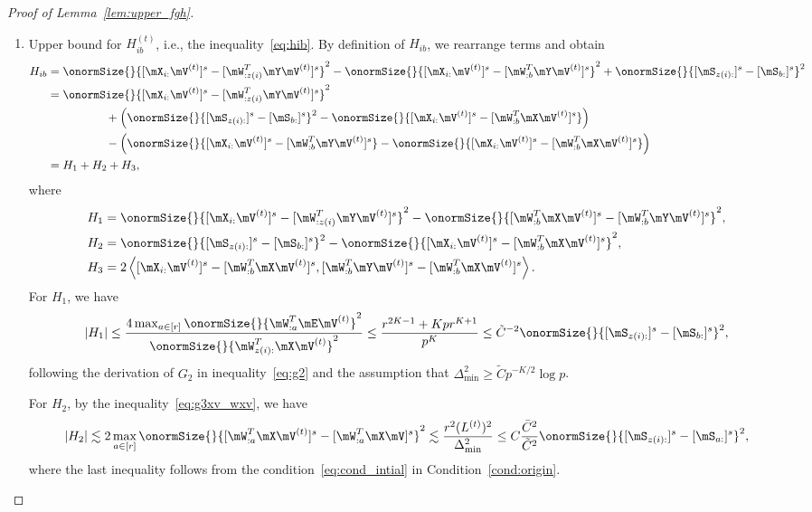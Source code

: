 \documentclass[lettersize,onecolumn,journal]{IEEEtran}
\theoremstyle{definition}
\theoremstyle{definition}
\newcommand{\of}[1]{\left(#1\right)}
\newcommand{\ang}[1]{\left\langle#1\right\rangle}
\begin{document}
\begin{proof}[Proof of Lemma~\ref{lem:upper_fgh}]
\begin{enumerate}[wide]
    \item Upper bound for $H_{ib}^{(t)}$, i.e., the inequality~\eqref{eq:hib}. By definition of $H_{ib}$, we rearrange terms and obtain
    \begin{align}
        H_{ib} &= \onormSize{}{ [\mX_{i:} \mV^{(t)}]^s -  [  \mW_{:z(i)}^T \mY \mV^{(t)} ]^s}^2 - \onormSize{}{ [\mX_{i:} \mV^{(t)}]^s -  [  \mW_{:b}^T \mY \mV^{(t)} ]^s}^2 + \onormSize{}{ [ \mS_{z(i):}  ]^s - [ \mS_{b:}  ]^s  }^2 \\
        & =  \onormSize{}{ [ \mX_{i:} \mV^{(t)}]^s -  [  \mW_{:z(i)}^T \mY \mV^{(t)} ]^s}^2 \\
        & \quad \quad \quad \quad \quad + \of{ \onormSize{}{ [ \mS_{z(i):}  ]^s - [ \mS_{b:}  ]^s  }^2 - \onormSize{}{ [\mX_{i:} \mV^{(t)}]^s-  [  \mW_{:b}^T \mX \mV^{(t)} ]^s }  } \\
        & \quad \quad \quad \quad \quad  - \of{\onormSize{}{ [\mX_{i:} \mV^{(t)}]^s-  [  \mW_{:b}^T \mY \mV^{(t)} ]^s } -  \onormSize{}{ [\mX_{i:} \mV^{(t)}]^s-  [  \mW_{:b}^T \mX \mV^{(t)} ]^s }   } \\
        & = H_1 + H_2 + H_3,
    \end{align}
    where 
    \begin{align}
        H_1 &= \onormSize{}{ [ \mX_{i:} \mV^{(t)}]^s -  [  \mW_{:z(i)}^T \mY \mV^{(t)} ]^s}^2 - \onormSize{}{ [ \mW_{:b}^T \mX \mV^{(t)}]^s -  [ \mW_{:b}^T \mY \mV^{(t)}]^s}^2, \\
        H_2 &=  \onormSize{}{ [ \mS_{z(i):}  ]^s - [ \mS_{b:}  ]^s  }^2 - \onormSize{}{ [\mX_{i:} \mV^{(t)}]^s-  [  \mW_{:b}^T \mX \mV^{(t)} ]^s }^2  , \\
        H_3 & = 2 \ang{  [\mX_{i:} \mV^{(t)}]^s  -  [  \mW_{:b}^T \mX \mV^{(t)} ]^s,  [  \mW_{:b}^T \mY \mV^{(t)} ]^s -  [  \mW_{:b}^T \mX \mV^{(t)} ]^s }.
    \end{align}
    For $H_1$, we have 
    \begin{align}
        |H_1| \leq  \frac{4 \max_{a \in [r]}\onormSize{}{ \mW_{:a}^T \mE \mV^{(t)} }^2 }{ \onormSize{}{ \mW_{z(i):}^T\mX \mV^{(t)}}^2}
         \leq  \frac{ r^{2K-1} + K p r^{K+1} }{p^{K}} 
        \leq \tilde C^{-2} \onormSize{}{ [ \mS_{z(i):}  ]^s - [ \mS_{b:}  ]^s  }^2\label{eq:h1},
    \end{align}
    following the derivation of $G_2$ in inequality~\eqref{eq:g2} and the assumption that $\Delta_{\min}^2 \geq \tilde C p^{-K/2} \log p$.

    For $H_2$, by the inequality~\eqref{eq:g3xv_wxv}, we have 
    \begin{equation}\label{eq:h2}
        |H_2| \lesssim 2\max_{a \in [r]}\onormSize{}{[\mW_{:a}^T\mX \mV^{(t)}]^s - [\mW_{:a}^T\mX \mV]^s }^2 \lesssim \frac{r^2 (L^{(t)})^2}{\Delta_{\min}^2} \leq C \frac{\bar C^2}{ \tilde C^2} \onormSize{}{ [ \mS_{z(i):} ]^s - [ \mS_{a:}]^s }^2,
    \end{equation}
    where the last inequality follows from the condition~\eqref{eq:cond_intial} in Condition~\ref{cond:origin}.
    

\end{enumerate}
\end{proof}
\end{document}

